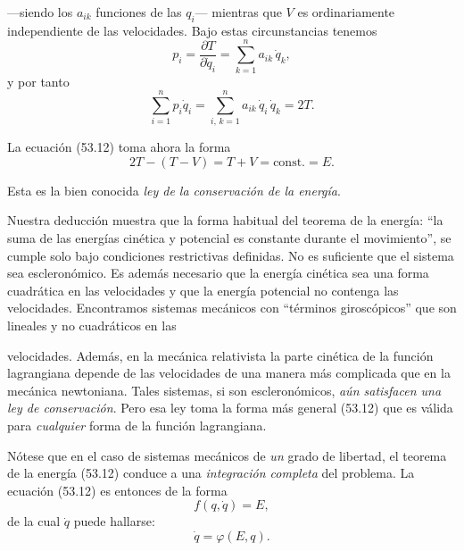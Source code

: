 \documentclass[12pt,a4paper]{book}
\begin{document}
---siendo los $a_{ik}$ funciones de las $q_i$--- mientras que $V$ es ordinariamente independiente de las velocidades. Bajo estas circunstancias tenemos
\begin{equation}
p_i = \frac{\partial T}{\partial \dot{q}_i} = \sum_{k=1}^{n} a_{ik}\,\dot{q}_k, \tag{53.14}
\end{equation}
y por tanto
\begin{equation}
\sum_{i=1}^{n} p_i \dot{q}_i = \sum_{i,\,k=1}^{n} a_{ik}\,\dot{q}_i\,\dot{q}_k = 2T. \tag{53.15}
\end{equation}

La ecuación (53.12) toma ahora la forma
\begin{equation}
2T - (T - V) = T + V = \text{const.} = E. \tag{53.16}
\end{equation}

Esta es la bien conocida \textit{ley de la conservación de la energía}.

Nuestra deducción muestra que la forma habitual del teorema de la energía: ``la suma de las energías cinética y potencial es constante durante el movimiento'', se cumple solo bajo condiciones restrictivas definidas. No es suficiente que el sistema sea escleronómico. Es además necesario que la energía cinética sea una forma cuadrática en las velocidades y que la energía potencial no contenga las velocidades. Encontramos sistemas mecánicos con ``términos giroscópicos'' que son lineales y no cuadráticos en las


velocidades. Además, en la mecánica relativista la parte cinética de la función lagrangiana depende de las velocidades de una manera más complicada que en la mecánica newtoniana. Tales sistemas, si son escleronómicos, \textit{aún satisfacen una ley de conservación}. Pero esa ley toma la forma más general (53.12) que es válida para \textit{cualquier} forma de la función lagrangiana.

Nótese que en el caso de sistemas mecánicos de \textit{un} grado de libertad, el teorema de la energía (53.12) conduce a una \textit{integración completa} del problema. La ecuación (53.12) es entonces de la forma
\begin{equation}
f(q, \dot{q}) = E, \tag{53.17}
\end{equation}
de la cual $\dot{q}$ puede hallarse:
\begin{equation}
\dot{q} = \varphi(E, q). \tag{53.18}
\end{equation}
\end{document}
